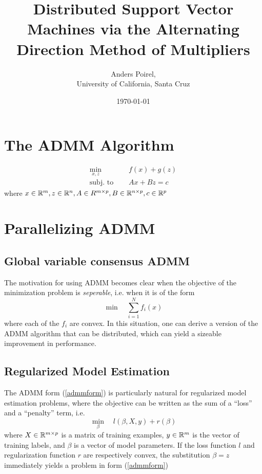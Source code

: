 \documentclass[11pt]{article}
\author{Anders Poirel, \\ University of California, Santa Cruz}
\date{\today}
\title{
    Distributed Support Vector Machines via the Alternating Direction Method of Multipliers
}
\begin{document}
\maketitle 

\section{The ADMM Algorithm}

\begin{equation} \label{admmform}
\begin{aligned}
    \min_{x, z} \quad & f(x) + g(z) \\
    \textrm{subj. to } \quad & Ax + Bz = c
\end{aligned}
\end{equation}
where $x \in \mathbb{R}^m, z \in \mathbb{R}^n, A \in R^{m \times p}, B \in \mathbb{R}^{n \times p}, c \in \mathbb{R}^p$

\subsection*{}

\section{Parallelizing ADMM}

\subsection*{Global variable consensus ADMM}

The motivation for using ADMM becomes clear when the objective of the minimization problem is 
\textit{seperable}, i.e. when it is of the form 
\[
    \min \quad \sum_{i=1}^N f_i(x)  
\]
where each of the $f_i$ are convex. In this situation, one can derive a version of the ADMM 
algorithm that can be distributed, which can yield a sizeable improvement in performance.


\subsection*{Regularized Model Estimation}

The ADMM form (\ref{admmform}) is particularly natural for regularized model estimation problems, 
where the objective can be written as the sum of a ``loss'' and a ``penalty'' term, i.e.
\[
    \min_{\beta} \quad {l(\beta, X, y) + r(\beta)}
\]
where $X \in \mathbb{R}^{m \times p}$ is a matrix of training examples, $y \in \mathbb{R}^m$ is the vector of training
labels, and $\beta$ is a vector of model parameters. If the loss function $l$ and regularization function 
$r$ are respectively convex, the substitution $\beta = z$ immediately yields a problem in form (\ref{admmform})
\end{document}
